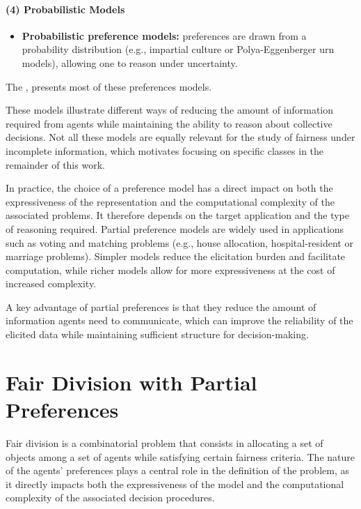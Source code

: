 \documentclass{article}
\begin{document}
\paragraph{(4) Probabilistic Models}

\begin{itemize}
    \item \textbf{Probabilistic preference models:} preferences are drawn from a probability distribution (e.g., impartial culture or Polya-Eggenberger urn models), allowing one to reason under uncertainty.
\end{itemize}

The \cite[Chapter 10]{brandt2016handbook}, presents most of these preferences models.

These models illustrate different ways of reducing the amount of information required from agents while maintaining the ability to reason about collective decisions. 
Not all these models are equally relevant for the study of fairness under incomplete information, which motivates focusing on specific classes in the remainder of this work.

In practice, the choice of a preference model has a direct impact on both the expressiveness of the representation and the computational complexity of the associated problems. 
It therefore depends on the target application and the type of reasoning required. Partial preference models are widely used in applications such as voting and matching problems (e.g., house allocation, hospital-resident or marriage problems). 
Simpler models reduce the elicitation burden and facilitate computation, while richer models allow for more expressiveness at the cost of increased complexity.

A key advantage of partial preferences is that they reduce the amount of information agents need to communicate, which can improve the reliability of the elicited data while maintaining sufficient structure for decision-making.

\section{Fair Division with Partial Preferences}

Fair division is a combinatorial problem that consists in allocating a set of objects among a set of agents while satisfying certain fairness criteria. 
The nature of the agents' preferences plays a central role in the definition of the problem, as it directly impacts both the expressiveness of the model and the computational complexity of the associated decision procedures.
\end{document}
